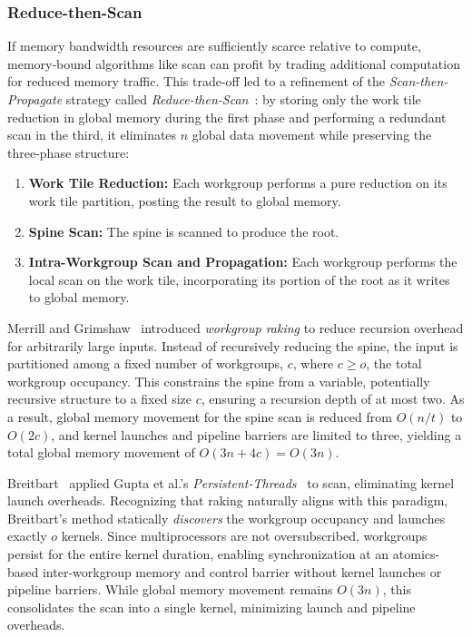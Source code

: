 \documentclass[acmsmall, manuscript, screen, review, anonymous]{acmart}
\begin{document}
\subsubsection{Reduce-then-Scan}
If memory bandwidth resources are sufficiently scarce relative to compute, memory-bound algorithms like scan can profit by trading additional computation for reduced memory traffic. This trade-off led to a refinement of the \emph{Scan-then-Propagate} strategy called \emph{Reduce-then-Scan}~\cite{10.1145/1375527.1375559, Merrill2009, 10.1109/TPDS.2012.336, 10.5555/2031978.2032029}: by storing only the work tile reduction in global memory during the first phase and performing a redundant scan in the third, it eliminates $n$ global data movement while preserving the three-phase structure:
\begin{enumerate}
  \item \textbf{Work Tile Reduction:} Each workgroup performs a pure reduction on its work tile partition, posting the result to global memory.
  \item \textbf{Spine Scan:} The spine is scanned to produce the root.
  \item \textbf{Intra-Workgroup Scan and Propagation:} Each workgroup performs the local scan on the work tile, incorporating its portion of the root as it writes to global memory.
\end{enumerate}

Merrill and Grimshaw~\cite{Merrill2009} introduced \emph{workgroup raking} to reduce recursion overhead for arbitrarily large inputs. Instead of recursively reducing the spine, the input is partitioned among a fixed number of workgroups, $c$, where $c \geq o$, the total workgroup occupancy. This constrains the spine from a variable, potentially recursive structure to a fixed size $c$, ensuring a recursion depth of at most two. As a result, global memory movement for the spine scan is reduced from $O(n/t)$ to $O(2c)$, and kernel launches and pipeline barriers are limited to three, yielding a total global memory movement of $O(3n + 4c) = O(3n)$.

Breitbart~\cite{10.5555/2031978.2032029} applied Gupta et al.'s \emph{Persistent-Threads}~\cite{gupta2012} to scan, eliminating kernel launch overheads. Recognizing that raking naturally aligns with this paradigm, Breitbart's method statically \emph{discovers} the workgroup occupancy and launches exactly $o$ kernels. Since multiprocessors are not oversubscribed, workgroups persist for the entire kernel duration, enabling synchronization at an atomics-based inter-workgroup memory and control barrier without kernel launches or pipeline barriers. While global memory movement remains $O(3n)$, this consolidates the scan into a single kernel, minimizing launch and pipeline overheads.
\end{document}
